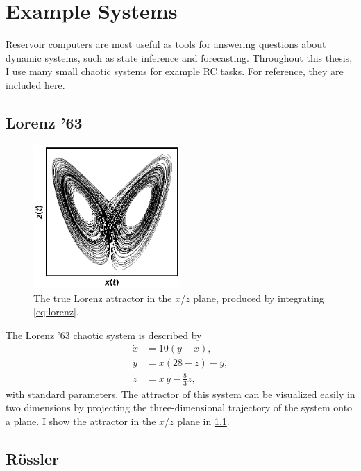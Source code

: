 \chapter{Example Systems}\label{ch:systems}

Reservoir computers are most useful as tools for answering questions
about dynamic systems, such as state inference and
forecasting. Throughout this thesis, I use many small chaotic systems
for example RC tasks. For reference, they are included here.

\section{Lorenz '63}

\begin{figure}
  \includegraphics[width=0.5\textwidth]{figures/lorenz}
  \caption{The true Lorenz attractor in the $x$/$z$ plane, produced by integrating \cref{eq:lorenz}.}%
  \label{fig:lorenz}
\end{figure}

The Lorenz '63 chaotic system is described by
\begin{equation}
  \begin{aligned}
    \dot{x} &= 10 \left(y - x\right), \\
    \dot{y} &= x \left(28 - z\right) - y, \\
    \dot{z} &= x\,y - \frac{8}{3} z,
  \end{aligned}
  \label{eq:lorenz}
\end{equation}
with standard parameters.\cite{lorenz1963} The attractor of this
system can be visualized easily in two dimensions by projecting the
three-dimensional trajectory of the system onto a plane. I show the
attractor in the $x$/$z$ plane in \cref{fig:lorenz}.

\section{R{\"{o}}ssler}

